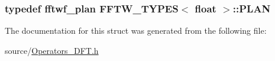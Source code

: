 \subsubsection[{P\+L\+A\+N}]{\setlength{\rightskip}{0pt plus 5cm}typedef fftwf\+\_\+plan {\bf F\+F\+T\+W\+\_\+\+T\+Y\+P\+E\+S}$<$ float $>$\+::{\bf P\+L\+A\+N}}\label{struct_f_f_t_w___t_y_p_e_s_3_01float_01_4_a564fe6a699a8574500c81d7d43b23980}


The documentation for this struct was generated from the following file\+:\begin{DoxyCompactItemize}
\item 
source/\hyperlink{_operators___d_f_t_8h}{Operators\+\_\+\+D\+F\+T.\+h}\end{DoxyCompactItemize}
